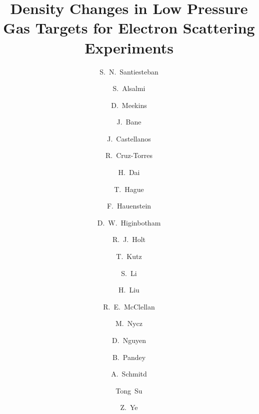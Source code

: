 \documentclass[final,5p,times,twocolumn]{elsarticle}
\begin{document}
\begin{frontmatter}



\title{Density Changes in Low Pressure Gas Targets for Electron Scattering Experiments}

\author[UNH]{S.~N.~Santiesteban}
\author[Kent]{S.~Alsalmi}
\author[JLab]{D.~Meekins}
\author[TN]{J.~Bane}
\author[FI]{J.~Castellanos}
\author[MIT]{R.~Cruz-Torres}
\author[VT]{H.~Dai}
\author[Kent]{T.~Hague}
\author[OD]{F.~Hauenstein}
\author[JLab]{D.~W.~Higinbotham}
\author[argonne,CalTech]{R.~J.~Holt}
\author[SB]{T.~Kutz}
\author[UNH]{S.~Li}
\author[COL]{H.~Liu}
\author[JLab]{R.~E.~McClellan}
\author[Kent]{M.~Nycz}
\author[UVa]{ D.~Nguyen}
\author[hampton]{B.~Pandey}
\author[MIT]{A.~Schmitd}
\author[Kent]{Tong~Su}
\author[argonne]{Z.~Ye}


\address[UNH]{University of New Hampshire, Durham, NH 03824 USA}
\address[Kent]{Kent State University, Kent, OH 44240}
\address[JLab]{Jefferson Lab, Newport News, VA 23601 USA}
\address[TN]{The University of Tennessee, Knoxville, Tennessee 37996, USA}
\address[FI]{Florida International University, Miami, FL 33199 USA}
\address[MIT]{Massachusetts Institute of Technology, Cambridge, Massachusetts 02139, USA}
\address[VT]{Virginia Tech, Blacksburg, Virginia 24061}
\address[OD]{Old Dominion University, Norfolk, Virginia 23529, USA}
\address[CalTech]{The Division of Physics Mathematics and Astronomy, California Institute of Technology, Pasadena California 91125 USA}
\address[argonne]{Physics Division, Argonne National Laboratory, Argonne, Illinois 60439, USA}
\address[COL]{Columbia University, New York, New York 10027, USA}
\address[SB]{Stony Brook University, Stony Brook, New York 11794, USA}
\address[UVA]{Department of Physics, University of Virginia, Charlottesville, Virginia 22904, USA}
\address[hampton]{Hampton University, Hampton, Virginia 23669, USA}



\end{frontmatter}
\end{document}
